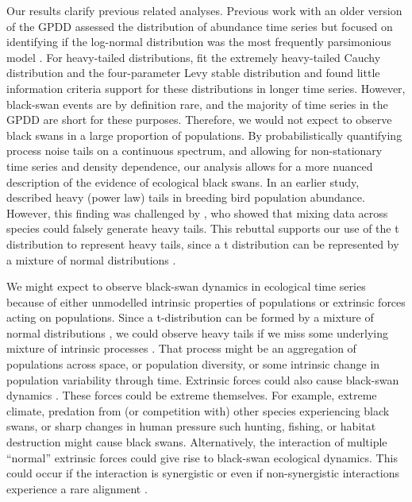 Our results clarify previous related analyses. Previous work with an older version of the GPDD assessed the distribution of abundance time series but focused on identifying if the log-normal distribution was the most frequently parsimonious model \citep{halley2002}. For heavy-tailed distributions, \citet{halley2002} fit the extremely heavy-tailed Cauchy distribution and the four-parameter Levy stable distribution and found little information criteria support for these distributions in longer time series. However, black-swan events are by definition rare, and the majority of time series in the GPDD are short for these purposes. Therefore, we would not expect to observe black swans in a large proportion of populations. By probabilistically quantifying process noise tails on a continuous spectrum, and allowing for non-stationary time series and density dependence, our analysis allows for a more nuanced description of the evidence of ecological black swans. In an earlier study, \citet{keitt1998} described heavy (power law) tails in breeding bird population abundance. However, this finding was challenged by \citet{allen2001}, who showed that mixing data across species could falsely generate heavy tails. This rebuttal supports our use of the t distribution to represent heavy tails, since a t distribution can be represented by a mixture of normal distributions \citep[with the same mean and inverse-gamma-distributed variances,][]{gelman2014}.

We might expect to observe black-swan dynamics in ecological time series because of either unmodelled intrinsic properties of populations or extrinsic forces acting on populations. Since a t-distribution can be formed by a mixture of normal distributions \citep{gelman2014}, we could observe heavy tails if we miss some underlying mixture of intrinsic processes \citep{allen2001}. That process might be an aggregation of populations across space, or population diversity, or some intrinsic change in population variability through time. Extrinsic forces could also cause black-swan dynamics \citep[e.g.][]{nunez2012}. These forces could be extreme themselves. For example, extreme climate, predation from (or competition with) other species experiencing black swans, or sharp changes in human pressure such hunting, fishing, or habitat destruction might cause black swans. Alternatively, the interaction of multiple ``normal'' extrinsic forces could give rise to black-swan ecological dynamics. This could occur if the interaction is synergistic \citep[e.g.][]{kirby2009} or even if non-synergistic interactions experience a rare alignment \citep{denny2009}.

